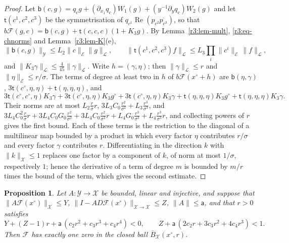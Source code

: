 \documentclass[11pt]{amsart}
\newtheorem{proposition}[theorem]{Proposition}
\theoremstyle{definition}
\theoremstyle{remark}
\numberwithin{equation}{section}
\newcommand{\Fc}{\mathcal{F}}
\DeclareMathOperator{\re}{Re}
\newcommand{\nrm}[1]{\lVert #1\rVert}
\begin{document}
\begin{proof}
Let $\mathsf b(c,g)=q_cg+(\partial_{x_1}q_c)W_1(g)+(y^{-1}\partial_yq_c)W_2(g)$ and let $\mathsf t(c^1,c^2,c^3)$ be the symmetrisation of $q_{c^1}\re(p_{c^2}\overline{p_{c^3}})$, so that $b\Fc(g,c)=\mathsf b(c,g)+\mathsf t(c,c,c)(1+K_3g)$. By Lemma~\ref{r3:lem-mult}, \eqref{r3:eq-chnorms} and Lemma~\ref{r3:lem-K}(e),
\[
\nrm{\mathsf b(c,g)}_{\mathcal Y}\leq L_2\nrm c_{\mathcal E}\nrm g_{\mathcal L},\qquad \nrm{\mathsf t(c^1,c^2,c^3)f}_{\mathcal L}\leq L_3\textstyle\prod_i\nrm{c^i}_{\mathcal E}\,\nrm f_{\mathcal L},
\]
and $\nrm{K_3\gamma}_{\mathcal L}\leq\frac4{45}\nrm\gamma_{\mathcal L}$. Write $h=(\gamma,\eta)$; then $\nrm\gamma_{\mathcal L}\leq r$ and $\nrm\eta_{\mathcal E}\leq r/\sigma$. The terms of degree at least two in $h$ of $b\Fc(x^\circ+h)$ are $\mathsf b(\eta,\gamma)$, $3\mathsf t(c^\circ,\eta,\eta)+\mathsf t(\eta,\eta,\eta)$, and
\[
3\mathsf t(c^\circ,c^\circ,\eta)K_3\gamma+3\mathsf t(c^\circ,\eta,\eta)K_3g^\circ+3\mathsf t(c^\circ,\eta,\eta)K_3\gamma+\mathsf t(\eta,\eta,\eta)K_3g^\circ+\mathsf t(\eta,\eta,\eta)K_3\gamma .
\]
Their norms are at most $L_2\frac r\sigma r$, $3L_3C_0\frac{r^2}{\sigma^2}+L_3\frac{r^3}{\sigma^3}$, and $3L_4C_0^2\frac r\sigma r+3L_4C_0G_0\frac{r^2}{\sigma^2}+3L_4C_0\frac{r^2}{\sigma^2}r+L_4G_0\frac{r^3}{\sigma^3}+L_4\frac{r^3}{\sigma^3}r$, and collecting powers of $r$ gives the first bound. Each of these terms is the restriction to the diagonal of a multilinear map bounded by a product in which every factor $\eta$ contributes $r/\sigma$ and every factor $\gamma$ contributes $r$. Differentiating in the direction $k$ with $\nrm k_{\mathcal X}\leq1$ replaces one factor by a component of $k$, of norm at most $1/\sigma$, respectively $1$; hence the derivative of a term of degree $m$ is bounded by $m/r$ times the bound of the term, which gives the second estimate.
\end{proof}

\begin{proposition}\label{r3:prop-NK}
Let $A\colon\mathcal Y\to\mathcal X$ be bounded, linear and injective, and suppose that $\nrm{A\Fc(x^\circ)}_{\mathcal X}\leq Y$, $\nrm{I-AD\Fc(x^\circ)}_{\mathcal X\to\mathcal X}\leq Z$, $\nrm A\leq\mathsf a$, and that $r>0$ satisfies
\begin{equation}\label{r3:eq-radii}
Y+(Z-1)r+\mathsf a\,(c_2r^2+c_3r^3+c_4r^4)<0,\qquad Z+\mathsf a\,(2c_2r+3c_3r^2+4c_4r^3)<1 .
\end{equation}
Then $\Fc$ has exactly one zero in the closed ball $\overline B_{\mathcal X}(x^\circ,r)$.
\end{proposition}
\end{document}
